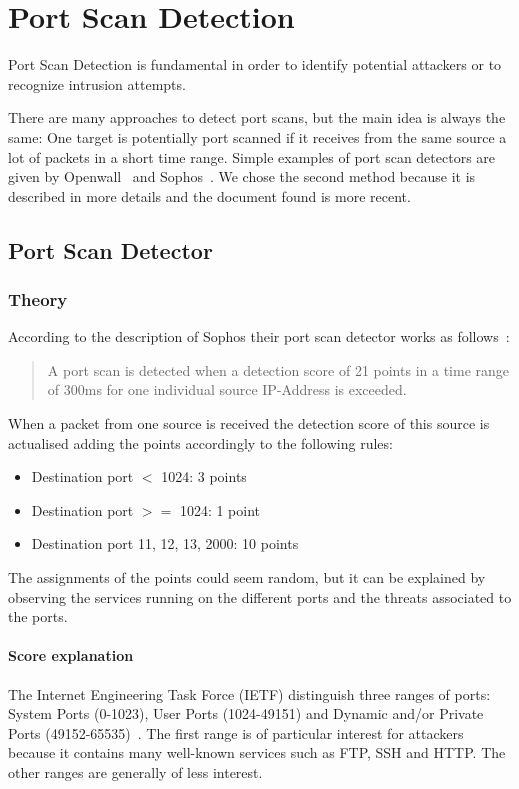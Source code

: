 \chapter{Port Scan Detection}
\label{sec:detector}
Port Scan Detection is fundamental in order
to identify potential attackers or to recognize intrusion attempts.

There are many approaches to detect port scans, but the main idea
is always the same: One target is potentially port scanned if it receives
from the same source a lot of packets in a short time range.
Simple examples of port scan detectors are given by 
Openwall~\cite{scanlogd} and Sophos~\cite{sophos}.
We chose the second method because it is described in more details and the document found
is more recent.

\section{Port Scan Detector}


\subsection{Theory}
According to the description of Sophos their port scan detector works as follows~\cite{sophos}:
\begin{quote}
	A port scan is detected when a detection score of 21 points
	in a time range of 300ms for one individual source IP-Address is exceeded.
\end{quote}
When a packet from one source is received the detection score of this source
is actualised adding the points accordingly to the following rules:
\begin{itemize}
	\item Destination port $<$ 1024: 3 points
	\item Destination port $>=$ 1024: 1 point
	\item Destination port 11, 12, 13, 2000: 10 points
\end{itemize}
The assignments of the points could seem random, but it can be explained by observing the services running on the different ports and the threats associated to the ports.
\subsubsection{Score explanation}
The Internet Engineering Task Force (IETF) distinguish three ranges of ports: System Ports (0-1023), 
User Ports (1024-49151) and Dynamic and/or Private Ports (49152-65535)~\cite{rfc6335}.
The first range is of particular interest for attackers because it contains many well-known services such as FTP, SSH and HTTP.
The other ranges are generally of less interest.


